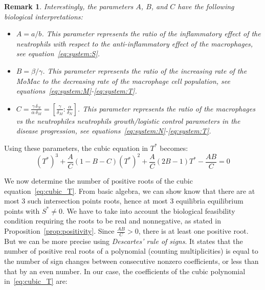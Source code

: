 \documentclass[a4paper, 12pt]{article}
\newtheorem{rem}{Remark}[section]
\providecommand{\DIFaddtex}[1]{{\protect\color{blue} \sf #1}} %
\providecommand{\DIFdeltex}[1]{{\protect\color{red} \scriptsize #1}} %
\providecommand{\DIFaddbegin}{} %
\providecommand{\DIFaddend}{} %
\providecommand{\DIFdelbegin}{} %
\providecommand{\DIFdelend}{} %
\providecommand{\DIFadd}[1]{\texorpdfstring{\DIFaddtex{#1}}{#1}} %
\providecommand{\DIFdel}[1]{\texorpdfstring{\DIFdeltex{#1}}{}} %
\begin{document}
\begin{rem}
Interestingly, the parameters $A$, $B$, and $C$ have the following biological interpretations:
\begin{itemize}
    \item $A = a/b$. This parameter represents the ratio of the inflammatory effect of the neutrophils with respect to the anti-inflammatory effect of the macrophages, see equation~\eqref{eq:system:S}.
    \item $B = \beta/\gamma$. This parameter represents the ratio of the increasing rate of the MoMac to the decreasing rate of the macrophage cell population, see equations~\eqref{eq:system:M}-\eqref{eq:system:T}.
    \item $C = \frac{\gamma \,\delta_N}{\alpha\,\delta_M} = \left[\frac{\gamma}{\delta_M} : \frac{\alpha}{\delta_N}\right]$. This parameter represents the ratio of the macrophages vs the \DIFdelbegin \DIFdel{neutrophiles }\DIFdelend \DIFaddbegin \DIFadd{neutrophils }\DIFaddend growth/logistic control parameters in the disease progression, see equations~\eqref{eq:system:N}-\eqref{eq:system:T}.
\end{itemize}   
\end{rem}
Using these parameters, the cubic equation in $T^*$ becomes:
\begin{equation} 
{\left(T^*\right)}^3 +  \frac{A}{C}  \left(1- B- C \right) {(T^*)}^2 + \frac{A}{C} \left(2 B -1 \right) T^* - \frac{A B}{C} = 0
\label{eq:cubic_T}
\end{equation}
\par\noindent We now determine the number of positive roots of the cubic equation~\eqref{eq:cubic_T}.
From basic algebra, we \DIFdelbegin \DIFdel{can show }\DIFdelend \DIFaddbegin \DIFadd{know }\DIFaddend that there are at most 3 \DIFdelbegin \DIFdel{such intersection points}\DIFdelend \DIFaddbegin \DIFadd{roots}\DIFaddend , hence at most 3 \DIFdelbegin \DIFdel{equilibria }\DIFdelend \DIFaddbegin \DIFadd{equilibrium }\DIFaddend points with $S^* \neq 0$. 
We have to take into account the biological feasibility condition requiring the roots to be real and nonnegative, as stated in Proposition~\ref{prop:positivity}.
Since $\frac{AB}{C} > 0$,  there is at least one positive root. 
But we can be more precise using 
\emph{Descartes' rule of signs}. It states that the number of positive real roots of a polynomial (counting multiplicities) is equal to the number of sign changes between consecutive nonzero coefficients, or less than that by an even number. 
In our case, the coefficients of the cubic polynomial in~\eqref{eq:cubic_T} are:
\end{document}
